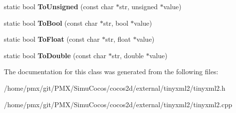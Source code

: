 \begin{DoxyCompactItemize}
\mbox{\label{classtinyxml2_1_1XMLUtil_a46f7e9542929001e726853ed8b571c07}} 
static bool {\bfseries To\+Unsigned} (const char $\ast$str, unsigned $\ast$value)
\item 
\mbox{\label{classtinyxml2_1_1XMLUtil_ae1692c644a807da2cd9e1e45f79a102f}} 
static bool {\bfseries To\+Bool} (const char $\ast$str, bool $\ast$value)
\item 
\mbox{\label{classtinyxml2_1_1XMLUtil_ac13b56b82e7f1d2d3954666b76c67d22}} 
static bool {\bfseries To\+Float} (const char $\ast$str, float $\ast$value)
\item 
\mbox{\label{classtinyxml2_1_1XMLUtil_a7e37ab30ba19c2b02042ab093172e9b8}} 
static bool {\bfseries To\+Double} (const char $\ast$str, double $\ast$value)
\end{DoxyCompactItemize}


The documentation for this class was generated from the following files\+:\begin{DoxyCompactItemize}
\item 
/home/pmx/git/\+P\+M\+X/\+Simu\+Cocos/cocos2d/external/tinyxml2/tinyxml2.\+h\item 
/home/pmx/git/\+P\+M\+X/\+Simu\+Cocos/cocos2d/external/tinyxml2/tinyxml2.\+cpp\end{DoxyCompactItemize}
